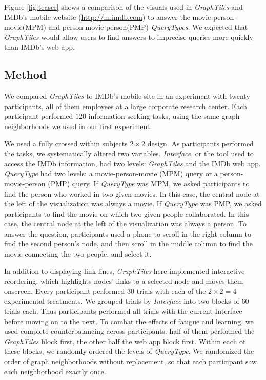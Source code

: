 \documentclass{sigchi}
\begin{document}
Figure \ref{fig:teaser} shows a comparison of the visuals used in \textit{GraphTiles} and IMDb's mobile website (\url{http://m.imdb.com}) to answer the movie-person-movie(MPM) and person-movie-person(PMP) \textit{QueryTypes}. We expected that \textit{GraphTiles} would allow users to find answers to imprecise queries more quickly than IMDb's web app.




\subsection{Method}

We compared \textit{GraphTiles} to IMDb's mobile site in an experiment with twenty participants, all of them employees at a large corporate research center. Each participant performed $120$ information seeking tasks, using the same graph neighborhoods we used in our first experiment.

We used a fully crossed within subjects $2 \times 2$ design. As participants performed the tasks, we systematically altered two variables. \textit{Interface}, or the tool used to access the IMDb information, had two levels: \textit{GraphTiles} and the IMDb web app. \textit{QueryType} had two levels: a movie-person-movie (MPM) query or a person-movie-person (PMP) query. If \textit{QueryType} was MPM, we asked participants to find the person who worked in two given movies. In this case, the central node at the left of the visualization was always a movie. If \textit{QueryType} was PMP, we asked participants to find the movie on which two given people collaborated. In this case, the central node at the left of the visualization was always a person. To answer the question, participants used a phone to scroll in the right column to find the second person's node, and then scroll in the middle column to find the movie connecting the two people, and select it.

In addition to displaying link lines, \textit{GraphTiles} here implemented interactive reordering, which highlights nodes' links to a selected node and moves them onscreen. Every participant performed $30$ trials with each of the $2 \times 2 = 4$ experimental treatments. We grouped trials by \textit{Interface} into two blocks of $60$ trials each. Thus participants performed all trials with the current Interface before moving on to the next. To combat the effects of fatigue and learning, we used complete counterbalancing across participants: half of them performed the \textit{GraphTiles} block first, the other half the web app block first. Within each of these blocks, we randomly ordered the levels of \textit{QueryType}. We randomized the order of graph neighborhoods without replacement, so that each participant saw each neighborhood exactly once.
\end{document}
